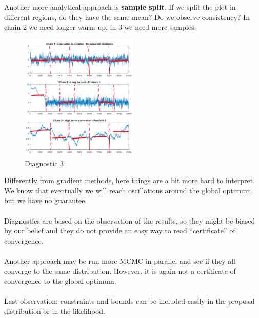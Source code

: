 \noindent
Another more analytical approach is \textbf{sample split}. If we split
the plot in different regions, do they have the same mean? Do we observe
consistency? In chain 2 we need longer warm up, in 3 we need more
samples.

\begin{figure}
\centering
\includegraphics[width=0.5\textwidth]{diag_3.png}
\caption{Diagnostic 3}
\end{figure}
\noindent
Differently from gradient methods, here things are a bit more hard to
interpret. We know that eventually we will reach oscillations around the
global optimum, but we have no guarantee.
\\
\\
\noindent
Diagnostics are based on the observation of the results, so they might
be biased by our belief and they do not provide an easy way to read
``certificate'' of convergence.
\\
\\
\noindent
Another approach may be run more MCMC in parallel and see if they all
converge to the same distribution. However, it is again not a
certificate of convergence to the global optimum.
\\
\\
\noindent
Last observation: constraints and bounds can be included easily in the
proposal distribution or in the likelihood.
